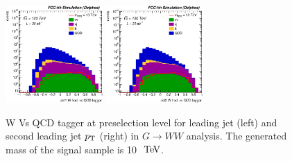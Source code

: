 \documentclass{cernrep}
\begin{document}
\begin{figure}[!htb]\centering
\includegraphics[width=0.33\textwidth]{Fig/RSGww/Jet1_Whad_vs_QCD_tagger_sel0_nostack_log.eps}
\includegraphics[width=0.33\textwidth]{Fig/RSGww/Jet2_Whad_vs_QCD_tagger_sel0_nostack_log.eps}
\caption{W Vs QCD tagger at preselection level for leading jet (left) and second leading jet $p\sb{\scriptstyle\mathrm{T}}$ (right) in $G \rightarrow WW$ analysis. The generated mass of the signal sample is 10 $\TeV$.}
\label{fig:RSGww_sel0_tagger}
\end{figure}


\end{document}
